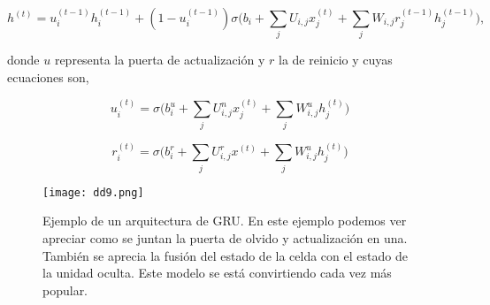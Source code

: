         \begin{equation}
            h^{(t)} = u^{(t-1)}_i h^{(t-1)}_i + ( 1 - u^{(t-1)}_i) \sigma \Big( b_i + \sum_j U_{i,j} x^{(t)}_j + \sum_j W_{i,j} r^{(t-1)}_j h^{(t-1)}_j \Big),
        \end{equation}
        
        \noindent donde $u$ representa la puerta de actualización y $r$ la de reinicio y cuyas ecuaciones son, 
        
        \begin{equation}
            u^{(t)}_i = \sigma \Big( b^u_i + \sum_j U^n_{i,j} x^{(t)}_j + \sum_j W^u_{i,j}h^{(t)}_j\Big)
        \end{equation}
	    
	    \begin{equation}
	        r^{(t)}_i = \sigma \Big( b^r_i +  \sum_j U^r_{i,j} x^{(t)} + \sum_j W^u_{i,j}h^{(t)}_j \Big)
	    \end{equation}
	    
	    
	    \begin{figure}[H]
	      \centering
	      \texttt{[image: dd9.png]}
	      \caption{Ejemplo de un arquitectura de GRU. En este ejemplo podemos ver apreciar como se juntan la puerta de olvido y actualización en una. También se aprecia la fusión del estado de la celda con el estado de la unidad oculta. Este modelo se está convirtiendo cada vez más popular.}
	      \label{fig:gru}
	    \end{figure}
	    
	   

    


\endinput